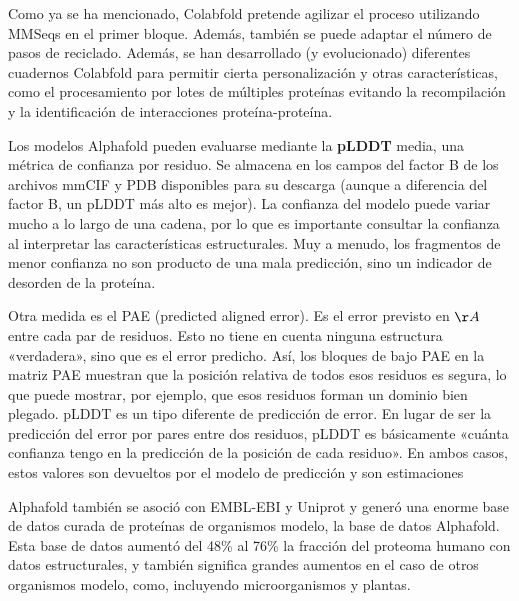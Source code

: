 Como ya se ha mencionado, Colabfold pretende agilizar el proceso utilizando MMSeqs en el primer bloque. Además, también se puede adaptar el número de pasos de reciclado. Además, se han desarrollado (y evolucionado) diferentes cuadernos Colabfold para permitir cierta personalización y otras características, como el procesamiento por lotes de múltiples proteínas evitando la recompilación y la identificación de interacciones proteína-proteína.

Los modelos Alphafold pueden evaluarse mediante la \textbf{pLDDT} media, una métrica de confianza por residuo. Se almacena en los campos del factor B de los archivos mmCIF y PDB disponibles para su descarga (aunque a diferencia del factor B, un pLDDT más alto es mejor). La confianza del modelo puede variar mucho a lo largo de una cadena, por lo que es importante consultar la confianza al interpretar las características estructurales. Muy a menudo, los fragmentos de menor confianza no son producto de una mala predicción, sino un indicador de desorden de la proteína.

Otra medida es el PAE (predicted aligned error). Es el error previsto en $\AA$ entre cada par de residuos. Esto no tiene en cuenta ninguna estructura «verdadera», sino que es el error predicho. Así, los bloques de bajo PAE en la matriz PAE muestran que la posición relativa de todos esos residuos es segura, lo que puede mostrar, por ejemplo, que esos residuos forman un dominio bien plegado. pLDDT es un tipo diferente de predicción de error. En lugar de ser la predicción del error por pares entre dos residuos, pLDDT es básicamente «cuánta confianza tengo en la predicción de la posición de cada residuo». En ambos casos, estos valores son devueltos por el modelo de predicción y son estimaciones

Alphafold también se asoció con EMBL-EBI y Uniprot y generó una enorme base de datos curada de proteínas de organismos modelo, la base de datos Alphafold. Esta base de datos aumentó del 48\% al 76\% la fracción del proteoma humano con datos estructurales, y también significa grandes aumentos en el caso de otros organismos modelo, como, incluyendo microorganismos y plantas.

